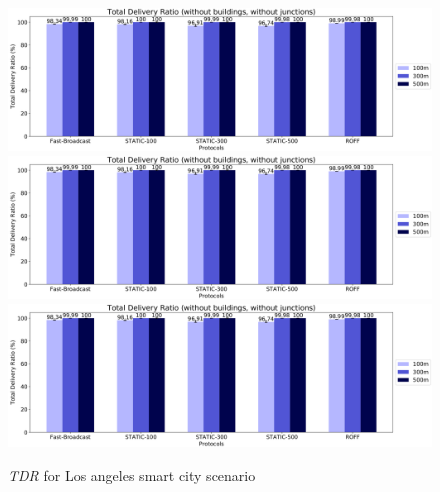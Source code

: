 	\begin{figure}[H]
		\centering
		\includegraphics[width=1.0\textwidth]{immagini/la-smart-city/b0/tdr}
		\includegraphics[width=1.0\textwidth]{immagini/la-smart-city/b1/h0/tdr}
		\includegraphics[width=1.0\textwidth]{immagini/la-smart-city/b1//h1/tdr}
		\caption{\textit{TDR} for Los angeles smart city scenario}
		\label{fig:la-smart-city-tdr}
	\end{figure}

